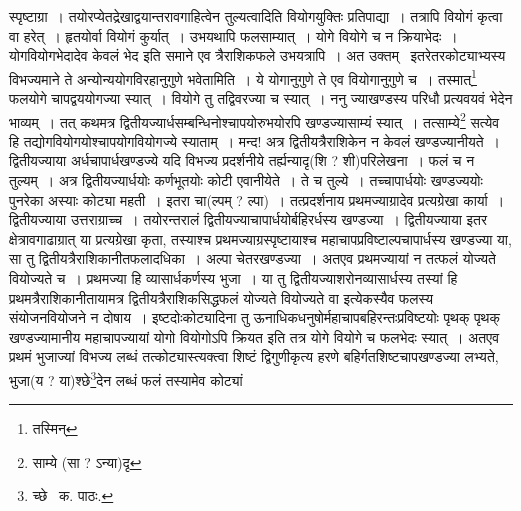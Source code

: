 \documentclass[11pt, openany]{book}
\begin{document}
\noindent स्पृष्टाग्रा~। तयोरप्येतद्रेखाद्वयान्तरावगाहित्वेन तुल्यत्वादिति वियोगयुक्तिः प्रतिपाद्या~। तत्रापि वियोगं कृत्वा वा हरेत्~। हृतयोर्वा वियोगं कुर्यात्~। उभयथापि फलसाम्यात्~। योगे वियोगे च न क्रियाभेदः~। योगवियोगभेदादेव केवलं भेद इति समाने एव त्रैराशिकफले उभयत्रापि~। अत उक्तम् \textendash\ इतरेतरकोट्याभ्यस्य विभज्यमाने ते अन्योन्ययोगविरहानुगुणे भवेतामिति~। ये योगानुगुणे ते एव वियोगानुगुणे च~। तस्मात्\renewcommand{\thefootnote}{१}\footnote{तस्मिन्} फलयोगे चापद्वययोगज्या स्यात्~। वियोगे तु तद्विवरज्या च स्यात्~। ननु ज्याखण्डस्य परिधौ प्रत्यवयवं भेदेन भाव्यम्~। तत् कथमत्र द्वितीयज्यार्धसम्बन्धिनोश्चापयोरुभयोरपि खण्डज्यासाम्यं स्यात्~। तत्साम्ये\renewcommand{\thefootnote}{२}\footnote{साम्ये (सा ? ऽन्या)दृ} सत्येव हि तद्योगवियोगयोश्चापयोगवियोगज्ये स्याताम्~। मन्द! अत्र द्वितीयत्रैराशिकेन न केवलं खण्डज्यानीयते~। द्वितीयज्याया अर्धचापार्धखण्डज्ये यदि विभज्य प्रदर्शनीये तर्ह्यन्यादृ(शि ? शी)परिलेखना~। फलं च न तुल्यम्~। अत्र द्वितीयज्यार्धयोः कर्णभूतयोः कोटी एवानीयेते~। ते च तुल्ये~। तच्चापार्धयोः खण्डज्ययोः पुनरेका अस्याः कोट्या महती~। इतरा चा(ल्पम् ? ल्पा)~। तत्प्रदर्शनाय प्रथमज्याग्रादेव प्रत्यग्रेखा कार्या~। द्वितीयज्याया उत्तराग्राच्च~। तयोरन्तरालं द्वितीयज्याचापार्धयोर्बहिरर्धस्य खण्डज्या~। द्वितीयज्याया इतर क्षेत्रावगाढाग्रात् या प्रत्यग्रेखा कृता, तस्याश्च प्रथमज्याग्रस्पृष्टायाश्च महाचापप्रविष्टाल्पचापार्धस्य खण्डज्या या, सा तु द्वितीयत्रैराशिकानीतफलादधिका~। अल्पा चेतरखण्डज्या~। अतएव प्रथमज्यायां न तत्फलं योज्यते वियोज्यते च~। प्रथमज्या हि व्यासार्धकर्णस्य भुजा~। या तु द्वितीयज्याशरोनव्यासार्धस्य तस्यां हि प्रथमत्रैराशिकानीतायामत्र द्वितीयत्रैराशिकसिद्धफलं योज्यते वियोज्यते वा इत्येकस्यैव फलस्य संयोजनवियोजने न दोषाय~। इष्टदोःकोट्यादिना तु ऊनाधिकधनुषोर्महाचापबहिरन्तःप्रविष्टयोः पृथक् पृथक् खण्डज्यामानीय महाचापज्यायां योगो वियोगोऽपि क्रियत इति तत्र योगे वियोगे च फलभेदः स्यात्~। अतएव प्रथमं भुजाज्यां विभज्य लब्धं तत्कोट्यास्त्यक्त्वा शिष्टं द्विगुणीकृत्य हरणे
बहिर्गतशिष्टचापखण्डज्या लभ्यते, भुजा(य ? या)श्छे\renewcommand{\thefootnote}{३}\footnote{च्छे \textendash\ क. पाठः.}देन लब्धं फलं तस्यामेव कोट्यां

\newpage 
\end{document}
